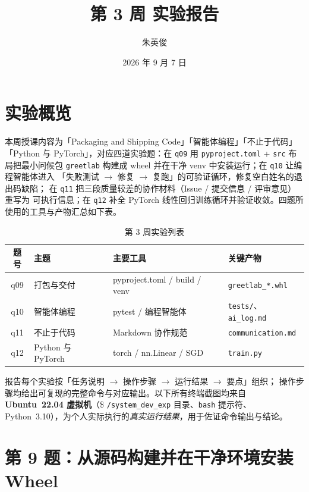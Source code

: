 \documentclass{hamesome-report}
\title{第 3 周 实验报告}
\author{朱英俊}
\date{2026 年 9 月 7 日}
\begin{document}
\maketitle
\tableofcontents
\vspace{0.3cm}

\section{实验概览}
本周授课内容为「Packaging and Shipping Code」「智能体编程」「不止于代码」
「Python 与 PyTorch」，对应四道实验题：在 \texttt{q09} 用
\texttt{pyproject.toml} + \texttt{src} 布局把最小问候包 \texttt{greetlab}
构建成 wheel 并在干净 venv 中安装运行；在 \texttt{q10} 让编程智能体进入
「失败测试 $\to$ 修复 $\to$ 复跑」的可验证循环，修复空白姓名的退出码缺陷；
在 \texttt{q11} 把三段质量较差的协作材料（Issue / 提交信息 / 评审意见）重写为
可执行信息；在 \texttt{q12} 补全 PyTorch 线性回归训练循环并验证收敛。四题所
使用的工具与产物汇总如下表。

\begin{table}[H]
\centering
\caption{第 3 周实验列表}
\label{tab:overview}
\begin{tabular}{|c|l|l|l|}
\hline
题号 & 主题 & 主要工具 & 关键产物 \\
\hline
q09 & 打包与交付 & pyproject.toml / build / venv & \texttt{greetlab\_*.whl} \\
q10 & 智能体编程 & pytest / 编程智能体 & \texttt{tests/}、\texttt{ai\_log.md} \\
q11 & 不止于代码 & Markdown 协作规范 & \texttt{communication.md} \\
q12 & Python 与 PyTorch & torch / nn.Linear / SGD & \texttt{train.py} \\
\hline
\end{tabular}
\end{table}

报告每个实验按「任务说明 $\to$ 操作步骤 $\to$ 运行结果 $\to$ 要点」组织；
操作步骤均给出可复现的完整命令与对应输出。以下所有终端截图均来自
\textbf{Ubuntu~22.04 虚拟机}（\$ \texttt{/system\_dev\_exp} 目录、\texttt{bash} 提示符、
Python~3.10），为个人实际执行的\emph{真实运行结果}，用于佐证命令输出与结论。

\section{第 9 题：从源码构建并在干净环境安装 Wheel}
\end{document}
